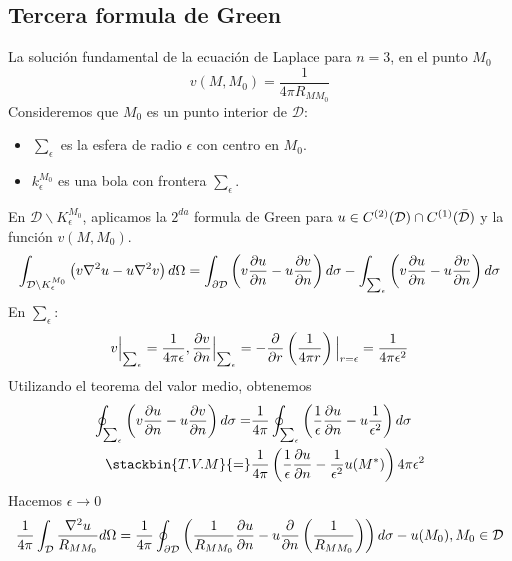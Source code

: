 \documentclass[../main]{subfiles}
\begin{document}
\subsection*{Tercera formula de Green}
La solución fundamental de la ecuación de Laplace para $n=3$, en el punto $M_0$
\begin{equation}
    v(M,M_0)=\dfrac{1}{4\pi R_{M M_0}}
\end{equation}
Consideremos que $M_0$ es un punto interior de $\mathcal{D}$:
\begin{itemize}
    \item $\sum_{\epsilon}$ es la esfera de radio $\epsilon$ con centro en $M_0$.
    \item $k_{\epsilon}^{M_0}$ es una bola con frontera $\sum_{\epsilon}$.
\end{itemize}
En $\mathcal{D} \backslash K_{\epsilon}^{M_0}$, aplicamos la $2^{da}$ formula de Green para $u \in C^{(2)}(\mathcal{D}) \cap C^{(1)}(\Bar{\mathcal{D}})$ y la función $v(M,M_0)$.
\begin{equation}
    \int_{\mathcal{D} \backslash K_{\epsilon}^{M_0}} \left(v\nabla^2 u-u\nabla^2 v\right) d\Omega = \int_{\partial \mathcal{D}} \left( v\pdv{u}{n}-u\pdv{v}{n}\right)d\sigma-\int_{\sum_{\epsilon}}\left(v\pdv{u}{n}-u\pdv{v}{n}\right) d\sigma
\end{equation}
En $\sum_{\epsilon}$:
\begin{equation}
    v \Big{|}_{\sum_{\epsilon}}=\dfrac{1}{4\pi\epsilon} , \pdv{v}{n} \Big{|}_{\sum_{\epsilon}}=-\pdv{}{r}\left(\dfrac{1}{4\pi r}\right)\Big{|}_{r=\epsilon}=\dfrac{1}{4\pi \epsilon^2}
\end{equation}
Utilizando el teorema del valor medio, obtenemos
\begin{align}
\begin{split}
    \oint_{\sum_{\epsilon}} \left(v\pdv{u}{n}-u\pdv{v}{n}\right)d\sigma=&\dfrac{1}{4\pi}\oint_{\sum_{\epsilon}} \left(\dfrac{1}{\epsilon}\pdv{u}{n}-u\dfrac{1}{\epsilon^2}\right)d\sigma \\
    \stackbin{T.V.M}{=}&\dfrac{1}{4\pi} \left(\dfrac{1}{\epsilon} \pdv{u}{n}(M^*)-\dfrac{1}{\epsilon^2}u(M^*)\right)4\pi \epsilon^2
\end{split}
\end{align}
Hacemos $\epsilon \rightarrow 0$
\begin{equation}
    \dfrac{1}{4\pi}\int_{\mathcal{D}} \dfrac{\nabla^2 u}{R_{M M_0}} d\Omega=\dfrac{1}{4\pi}\oint_{\partial \mathcal{D}} \left(\dfrac{1}{R_{M M_0}} \pdv{u}{n}-u\pdv{}{n}\left(\dfrac{1}{R_{M M_0}}\right)\right)d\sigma-u(M_0) , M_0 \in \mathcal{D}
\end{equation}
\end{document}

